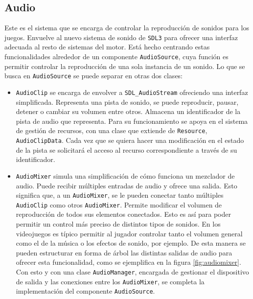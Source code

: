 \subsection{Audio}
Este es el sistema que se encarga de controlar la reproducción de sonidos para los juegos. Envuelve al nuevo sistema de sonido de \texttt{SDL3} para ofrecer una interfaz adecuada al resto de sistemas del motor. Está hecho centrando estas funcionalidades alrededor de un componente \texttt{AudioSource}, cuya función es permitir controlar la reproducción de una sola instancia de un sonido. Lo que se busca en \texttt{AudioSource} se puede separar en otras dos clases:

\begin{itemize}
	\item \texttt{AudioClip} se encarga de envolver a \texttt{SDL\_AudioStream} ofreciendo una interfaz simplificada. Representa una pista de sonido, se puede reproducir, pausar, detener o cambiar su volumen entre otros. Almacena un identificador de la pista de audio que representa. Para su funcionamiento se apoya en el sistema de gestión de recursos, con una clase que extiende de \texttt{Resource}, \texttt{AudioClipData}. Cada vez que se quiera hacer una modificación en el estado de la pista se solicitará el acceso al recurso correspondiente a través de su identificador.
	\item \texttt{AudioMixer} simula una simplificación de cómo funciona un mezclador de audio. Puede recibir múltiples entradas de audio y ofrece una salida. Esto significa que, a un \texttt{AudioMixer}, se le pueden conectar tanto múltiples \texttt{AudioClip} como otros \texttt{AudioMixer}. Permite modificar el volumen de reproducción de todos sus elementos conectados. Esto es así para poder permitir un control más preciso de distintos tipos de sonidos. En los videojuegos es típico permitir al jugador controlar tanto el volumen general como el de la música o los efectos de sonido, por ejemplo. De esta manera se pueden estructurar en forma de árbol las distintas salidas de audio para ofrecer esta funcionalidad, como se ejemplifica en la figura \ref{fig:audiomixer}. Con esto y con una clase \texttt{AudioManager}, encargada de gestionar el dispositivo de salida y las conexiones entre los \texttt{AudioMixer}, se completa la implementación del componente \texttt{AudioSource}.
\end{itemize}


